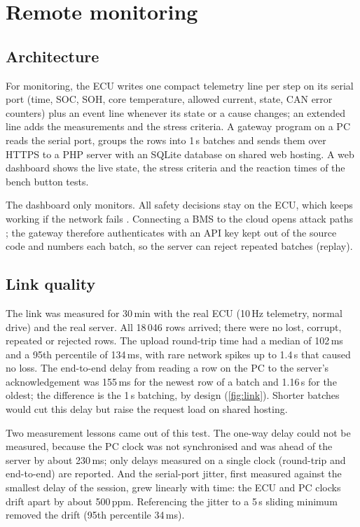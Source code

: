 \chapter{Remote monitoring}\label{ch:monitoring}

\section{Architecture}
For monitoring, the ECU writes one compact telemetry line per step on its serial port (time, SOC, SOH, core temperature, allowed current, state, CAN error counters) plus an event line whenever its state or a cause changes; an extended line adds the measurements and the stress criteria. A gateway program on a PC reads the serial port, groups the rows into 1\,s batches and sends them over HTTPS to a PHP server with an SQLite database on shared web hosting. A web dashboard shows the live state, the stress criteria and the reaction times of the bench button tests.

The dashboard only monitors. All safety decisions stay on the ECU, which keeps working if the network fails \citep{li2020}. Connecting a BMS to the cloud opens attack paths \citep{naseri2023}; the gateway therefore authenticates with an API key kept out of the source code and numbers each batch, so the server can reject repeated batches (replay).


\section{Link quality}
The link was measured for 30\,min with the real ECU (10\,Hz telemetry, normal drive) and the real server. All 18\,046 rows arrived; there were no lost, corrupt, repeated or rejected rows. The upload round-trip time had a median of 102\,ms and a 95th percentile of 134\,ms, with rare network spikes up to 1.4\,s that caused no loss. The end-to-end delay from reading a row on the PC to the server's acknowledgement was 155\,ms for the newest row of a batch and 1.16\,s for the oldest; the difference is the 1\,s batching, by design (\cref{fig:link}). Shorter batches would cut this delay but raise the request load on shared hosting.


Two measurement lessons came out of this test. The one-way delay could not be measured, because the PC clock was not synchronised and was ahead of the server by about 230\,ms; only delays measured on a single clock (round-trip and end-to-end) are reported. And the serial-port jitter, first measured against the smallest delay of the session, grew linearly with time: the ECU and PC clocks drift apart by about 500\,ppm. Referencing the jitter to a 5\,s sliding minimum removed the drift (95th percentile 34\,ms).
